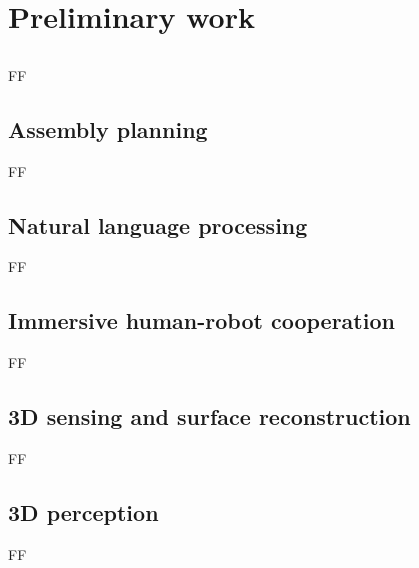 \chapter{Preliminary work}\label{chap:preliminary-work}

\section*{}

FF


\section{Assembly planning}

FF


\section{Natural language processing}

FF


\section{Immersive human-robot cooperation}

FF


\section{3D sensing and surface reconstruction}

FF


\section{3D perception}

FF
